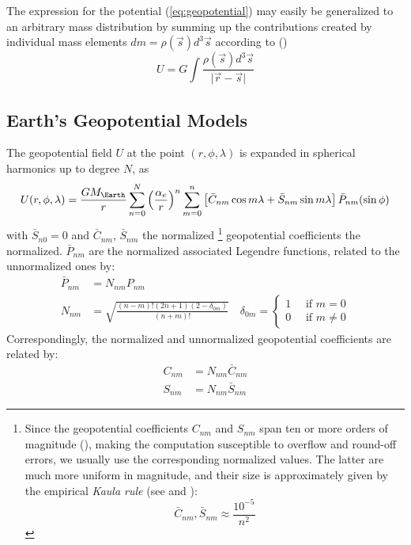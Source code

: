 The expression for the potential (\ref{eq:geopotential}) may easily be 
generalized to an arbitrary mass distribution by summing up the contributions 
created by individual mass elements
\(dm = \rho(\vec{s}) d^3 \vec{s}\) according to (\cite{Montenbruck2000})
\begin{equation}
    U = G \int{\frac{\rho(\vec{s}) d^3 \vec{s}}{\lvert \vec{r} - \vec{s} \rvert}}
\end{equation}


\subsection{Earth's Geopotential Models}
The geopotential field $U$ at the point $(r, \phi , \lambda )$ is expanded in 
spherical harmonics up to degree $N$, as
\begin{equation}
  \label{eq:iers201061}
  U(r, \phi , \lambda ) = \frac{G M_{\Earth}}{r} \sum_{n=0}^N 
    {\left(\frac{\alpha _e}{r}\right)}^n 
     \sum_{m=0}^n \left[ \bar{C}_{nm} \cos {m \lambda} + \bar{S}_{nm} \sin{m \lambda} \right] 
     \bar{P}_{nm}( \sin \phi )
\end{equation}
with $\bar{S}_{n0} = 0$ and $\bar{C}_{nm}$, $\bar{S}_{nm}$ the normalized
\footnote{Since the geopotential coefficients $C_{nm}$ and $S_{nm}$ span ten or 
more orders of magnitude (\cite{Montenbruck2000}), making the computation 
susceptible to overflow and round-off errors, we usually use the corresponding 
normalized values. The latter are much more uniform in magnitude, and their 
size is approximately given by the empirical \emph{Kaula rule} (see 
\cite{Montenbruck2000} and \cite{Kaula2000}):
\begin{equation} \bar{C}_{nm} , \bar{S}_{nm} \approx \frac{10^{-5}}{n^2} \end{equation}}
geopotential coefficients the normalized. $\bar{P}_{nm}$ are the normalized 
associated Legendre functions, related to the unnormalized ones by:
\begin{subequations}
  \begin{align}
    \bar{P}_{nm} &= N_{nm} P_{nm} \label{eq:iers201062a} \\
    N_{nm} &= \sqrt{\frac{(n-m)!(2n+1)(2-\delta _{0m})}{(n+m)!}} 
      \quad \delta _{0m} = 
        \begin{cases}
          1 \quad \text{ if } m = 0 \\
          0 \quad \text{ if } m \neq 0
        \end{cases}
        \label{eq:iers201062b}
  \end{align}
\end{subequations}
Correspondingly, the normalized and unnormalized geopotential coefficients are 
related by:
\begin{subequations}
  \begin{align}
    C_{nm} &= N_{nm} \bar{C}_{nm} \\
    S_{nm} &= N_{nm} \bar{S}_{nm}
  \end{align}
\end{subequations}

